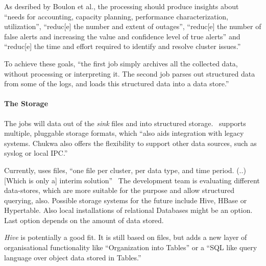 As desribed by Boulon et al., the \mr processing should produce insights about ``needs for accounting, capacity planning, performance characterization, utilization'', ``reduc[e] the number and extent of outages'', ``reduc[e] the number of false alerts and increasing the value and confidence level of true alerts'' and ``reduc[e] the time and effort required to identify and resolve cluster issues.''\cite{Boulonb}

To achieve these goals, ``the first job simply archives all the collected data, without processing or interpreting it. The second job parses out structured data from some of the logs, and loads this structured data into a data store.''~\cite{Boulona} 


\paragraph{The Storage}

The \mr jobs will \demux data out of the \textit{sink} files and into structured storage.~\cite{Boulonb} 
\chuk supports multiple, pluggable storage formats, which ``also aids integration with legacy systems. Chukwa also offers the flexibility to support other data sources, such as syslog or local IPC.''~\cite{Rabkin2010a} 

Currently, \chuk uses \hdfs files, ``one file per cluster, per data type, and time period. (..) [Which is only a] interim solution''~\cite{Boulona} 
The development team is evaluating different data-stores, which are more suitable for the purpose and allow structured querying, also.
Possible storage systems for the future include Hive, HBase or Hypertable. Also local installations of relational Databases might be an option.~\cite{Boulonb} Last option depends on the amount of data stored.

\textit{Hive} is potentially a good fit. It is still based on \hdfs files, but adds a new layer of organisational functionality like ``Organization into Tables'' or a ``SQL like query language over object data stored in Tables.''~\cite{Sarma08}